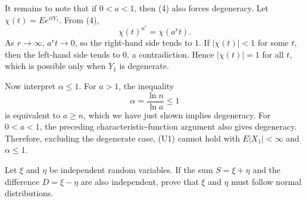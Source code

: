 \begin{solution}
It remains to note that if $0<a<1$, then (4) also forces degeneracy. Let $\chi(t)=E e^{itY_1}$. From (4),
\[
{\chi(t)}^{n^r}=\chi(a^r t).
\]
As $r\to\infty$, $a^r t\to 0$, so the right-hand side tends to $1$. If $|\chi(t)|<1$ for some $t$, then the left-hand side tends to $0$, a contradiction. Hence $|\chi(t)|=1$ for all $t$, which is possible only when $Y_1$ is degenerate.

Now interpret $\alpha\leq 1$. For $a>1$, the inequality
\[
\alpha=\frac{\ln n}{\ln a}\leq 1
\]
is equivalent to $a\geq n$, which we have just shown implies degeneracy. For $0<a<1$, the preceding characteristic-function argument also gives degeneracy. Therefore, excluding the degenerate case, (U1) cannot hold with $E|X_1|<\infty$ and $\alpha\leq 1$.
\end{solution}

\begin{exercise}\label{probability:2026:6}
Let $\xi$ and $\eta$ be independent random variables. If the sum $S=\xi+\eta$ and the difference $D=\xi-\eta$ are also independent, prove that $\xi$ and $\eta$ must follow normal distributions.
\end{exercise}

